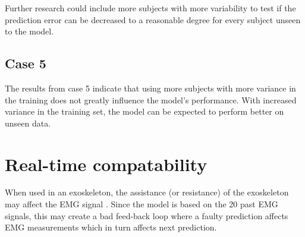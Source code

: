 \documentclass[../main.tex]{subfiles}
\begin{document}
Further research could include more subjects with more variability to test if the prediction error can be decreased to a reasonable degree for every subject unseen to the model.

\subsection{Case 5}
\label{sec:discussion-case5}
The results from case 5 indicate that using more subjects with more variance in the training does not greatly influence the model's performance.
With increased variance in the training set, the model can be expected to perform better on unseen data.

\section{Real-time compatability}
\label{sec:discussion_real-time}
When used in an exoskeleton, the assistance (or resistance) of the exoskeleton may affect the \ac{EMG} signal \cite{Androwis2018}.
Since the model is based on the 20 past \ac{EMG} signals, this may create a bad feed-back loop where a faulty prediction affects \ac{EMG} measurements which in turn affects next prediction.
\end{document}
